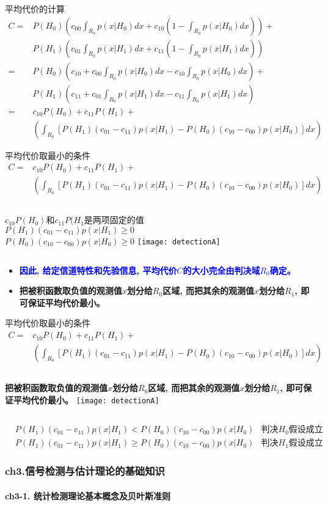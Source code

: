 \begin{frame}[shrink]{平均代价的计算}
\begin{align*}
C=&P(H_0)\left(c_{00}\int_{R_0}p(x|H_0)dx+c_{10}\left(1-\int_{R_0}p(x|H_0)dx\right)\right)+\\
&P(H_1)\left(c_{01}\int_{R_0}p(x|H_1)dx+c_{11}\left(1-\int_{R_0}p(x|H_1)dx\right)\right)\\
=&P(H_0)\left(c_{10}+c_{00}\int_{R_0}p(x|H_0)dx-c_{10}\int_{R_0}p(x|H_0)dx\right)+\\
&P(H_1)\left(c_{11}+c_{01}\int_{R_0}p(x|H_1)dx-c_{11}\int_{R_0}p(x|H_1)dx\right)\\
=&c_{10}P(H_0)+c_{11}P(H_1)+\\
&\left(\int_{R_0}\left[P({H_1})(c_{01}-c_{11})p(x|H_1)-P(H_0)(c_{10}-c_{00})p(x|H_0)\right]dx \right)
\end{align*}
\end{frame}

\begin{frame}[shrink]{平均代价取最小的条件}
\begin{align*}
C=&c_{10}P(H_0)+c_{11}P(H_1)+\\
&\left(\int_{R_0}\left[P({H_1})(c_{01}-c_{11})p(x|H_1)-P(H_0)(c_{10}-c_{00})p(x|H_0)\right]dx \right)
\end{align*}
\begin{columns}
	$c_{10}P(H_0)$和$c_{11}P(H_1$是两项固定的值\\
	$P({H_1})(c_{01}-c_{11})p(x|H_1)\ge 0$\\
	$P(H_0)(c_{10}-c_{00})p(x|H_0)\ge 0$
	\texttt{[image: detectionA]}
\end{columns}
\begin{itemize}
	\item \textcolor{blue}{\textbf{因此, 给定信道特性和先验信息, 平均代价$C$的大小完全由判决域$R_0$确定。}}
	\item \textbf{把被积函数取负值的观测值$x$划分给$R_0$区域, 而把其余的观测值$x$划分给$R_1$, 即可保证平均代价最小。}
\end{itemize}
\end{frame}

\begin{frame}[shrink]{平均代价取最小的条件}
\begin{align*}
C=&c_{10}P(H_0)+c_{11}P(H_1)+\\
&\left(\int_{R_0}\left[P({H_1})(c_{01}-c_{11})p(x|H_1)-P(H_0)(c_{10}-c_{00})p(x|H_0)\right]dx \right)
\end{align*}
\begin{columns}
	\textbf{把被积函数取负值的观测值$x$划分给$R_0$区域, 而把其余的观测值$x$划分给$R_1$, 即可保证平均代价最小。}
	\texttt{[image: detectionA]}
\end{columns}
\begin{align*}
&P({H_1})(c_{01}-c_{11})p(x|H_1)< P(H_0)(c_{10}-c_{00})p(x|H_0)&\textbf{判决$H_0$假设成立}\\
&P({H_1})(c_{01}-c_{11})p(x|H_1)\ge P(H_0)(c_{10}-c_{00})p(x|H_0)&\textbf{判决$H_1$假设成立}
\end{align*}
\end{frame}

\begin{frame}[shrink]
\frametitle{ch3.信号检测与估计理论的基础知识}
\framesubtitle{ch3-1. 统计检测理论基本概念及贝叶斯准则}
\tableofcontents[hideallsubsections]
\end{frame}
